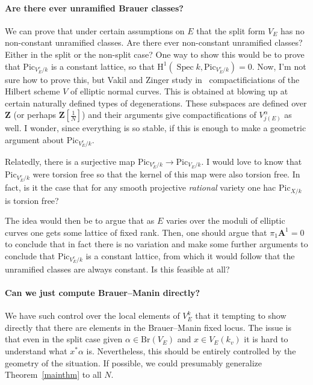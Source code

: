 \documentclass[10pt,letterpaper,twoside]{article}
\renewcommand{\H}{\mathrm{H}}
\renewcommand{\1}{\mathbf{1}}
\newcommand{\bA}{\mathbf{A}}
\newcommand{\bZ}{\mathbf{Z}}
\newcommand{\Pic}{\mathrm{Pic}}
\newcommand{\Br}{\mathrm{Br}}
\DeclareMathOperator{\Spec}{Spec}
\theoremstyle{plain}
\theoremstyle{plain}
\theoremstyle{definition}
\theoremstyle{named}
\theoremstyle{definition}
\begin{document}
	\paragraph{Are there ever unramified Brauer classes?} We can prove that under certain assumptions on
	$E$ that the split form $V_E$ has no non-constant unramified classes. Are there ever non-constant
	unramified classes? Either in the split or the non-split case? One way to show this would be to
	prove that $\Pic_{V^c_E/k}$ is a constant lattice, so that $\H^1(\Spec k,\Pic_{V^c_E/k})=0$. Now,
	I'm not sure how to prove this, but Vakil and Zinger study
	in~\cite{vakil-zinger,vakil-zinger-announce} compactificiations of the Hilbert scheme $V$ of elliptic normal
	curves. This is obtained at blowing up at certain naturally defined types of degenerations. These
	subspaces are defined over $\bZ$ (or perhaps $\bZ[\tfrac{1}{N}]$) and their arguments give
	compactifications of $V_{j(E)}^\alpha$ as well. I wonder, since everything is so stable, if this is
	enough to make a geometric argument about $\Pic_{V^c_E/k}$.
	
	Relatedly, there is a surjective map $\Pic_{V^c_E/k}\rightarrow\Pic_{V_E/k}$. I would love to know
	that $\Pic_{V^c_E/k}$ were torsion free so that the kernel of this map were also torsion free. In
	fact, is it the case that for any smooth projective {\em rational} variety one hac $\Pic_{X/k}$ is
	torsion free?
	
	The idea would then be to argue that as $E$ varies over the moduli of elliptic curves one gets some
	lattice of fixed rank. Then, one should argue that $\pi_1\bA^1=0$ to conclude that in fact there is
	no variation and make some further arguments to conclude that $\Pic_{V^c_E/k}$ is a constant
	lattice, from which it would follow that the unramified classes are always constant. Is this
	feasible at all?
	
	\paragraph{Can we just compute Brauer--Manin directly?} We have such control over the local elements
	of $V_E^k$ that it tempting to show directly that there are elements in the Brauer--Manin fixed
	locus. The issue is that even in the split case given $\alpha\in\Br(V_E)$ and $x\in V_E(k_v)$ it is
	hard to understand what $x^*\alpha$ is.
	Nevertheless, this should be entirely controlled by the geometry of the situation. If possible, we
	could presumably generalize Theorem~\ref{mainthm} to all $N$.
	
\end{document}
